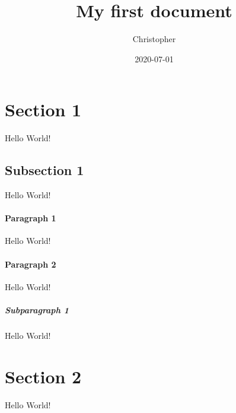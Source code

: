\documentclass{article}
\title{My first document}
\date{2020-07-01}
\author{Christopher}
\begin{document}
	\maketitle
	\newpage
	
	\section{Section 1}
		Hello World!	
	
	\subsection{Subsection 1}
		Hello World!
	
		\paragraph{Paragraph 1}
			Hello World!
		
		\paragraph{Paragraph 2}
			Hello World!
			
			\subparagraph{Subparagraph 1}
				Hello World!
	
	\section{Section 2}
		Hello World!
\end{document}
